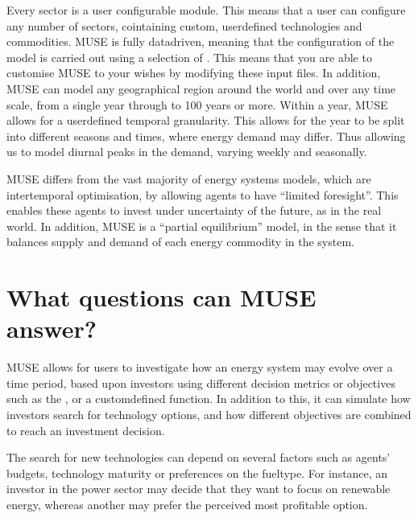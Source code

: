 \documentclass[letterpaper,10pt,english]{sphinxmanual}
\begin{document}
Every sector is a user configurable module. This means that a user can configure any number of sectors, cointaining custom, user\sphinxhyphen{}defined technologies and commodities. MUSE is fully data\sphinxhyphen{}driven, meaning that the configuration of the model is carried out using a selection of {\hyperref[\detokenize{inputs/index:input-files}]{}}. This means that you are able to customise MUSE to your wishes by modifying these input files. In addition, MUSE can model any geographical region around the world and over any time scale, from a single year through to 100 years or more. Within a year, MUSE allows for a user\sphinxhyphen{}defined temporal granularity. This allows for the year to be split into different seasons and times, where energy demand may differ. Thus allowing us to model diurnal peaks in the demand, varying weekly and seasonally.

MUSE differs from the vast majority of energy systems models, which are intertemporal optimisation, by allowing agents to have “limited foresight”. This enables these agents to invest under uncertainty of the future, as in the real world. In addition, MUSE is a “partial equilibrium” model, in the sense that it balances supply and demand of each energy commodity in the system.


\section{What questions can MUSE answer?}
\label{\detokenize{overview:what-questions-can-muse-answer}}
MUSE allows for users to investigate how an energy system may evolve over a time period, based upon investors using different decision metrics or objectives such as the ,  or a custom\sphinxhyphen{}defined function. In addition to this, it can simulate how investors search for technology options, and how different objectives are combined to reach an investment decision.

The search for new technologies can depend on several factors such as agents’ budgets, technology maturity or preferences on the fuel\sphinxhyphen{}type. For instance, an investor in the power sector may decide that they want to focus on renewable energy, whereas another may prefer the perceived most profitable option.
\end{document}
